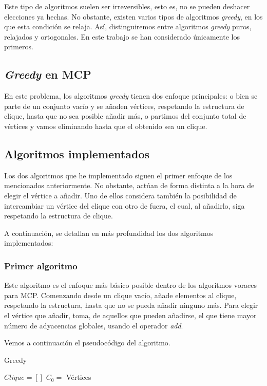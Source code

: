 Este tipo de algoritmos suelen ser irreversibles, esto es, no se pueden deshacer elecciones ya hechas.
No obstante, existen varios tipos de algoritmos \textit{greedy}, en los que esta condición se relaja. Así,
distinguiremos entre algoritmos \textit{greedy} puros, relajados y ortogonales. En este trabajo se han
considerado únicamente los primeros.

\subsection{\textit{Greedy} en MCP}

En este problema, los algoritmos \textit{greedy} tienen dos enfoque principales: o bien se parte de un conjunto
vacío y se añaden vértices, respetando la estructura de clique, hasta que no sea posible añadir más, o partimos
del conjunto total de vértices y vamos eliminando hasta que el obtenido sea un clique.

\subsection{Algoritmos implementados}

Los dos algoritmos que he implementado siguen el primer enfoque de los mencionados anteriormente.
No obstante, actúan de forma distinta a la hora de elegir el vértice a añadir. Uno de ellos considera
también la posibilidad de intercambiar un vértice del clique con otro de fuera, el cual, al añadirlo,
siga respetando la estructura de clique.

A continuación, se detallan en más profundidad los dos algoritmos implementados:

\subsubsection{Primer algoritmo}

Este algoritmo es el enfoque más básico posible dentro de los algoritmos voraces para MCP.
Comenzando desde un clique vacío, añade elementos al clique, respetando la estructura, hasta
que no se pueda añadir ninguno más. Para elegir el vértice que añadir, toma, de aquellos que
pueden añadirse, el que tiene mayor número de adyacencias globales, usando el operador \textit{add}.

Vemos a continuación el pseudocódigo del algoritmo.

\begin{algorithm}[H]
\caption{Greedy}
  \begin{algorithmic}
  \State $Clique = [ ]$
  \State $C_0 = $ Vértices
  \Repeat
  \end{algorithmic}
\end{algorithm}


